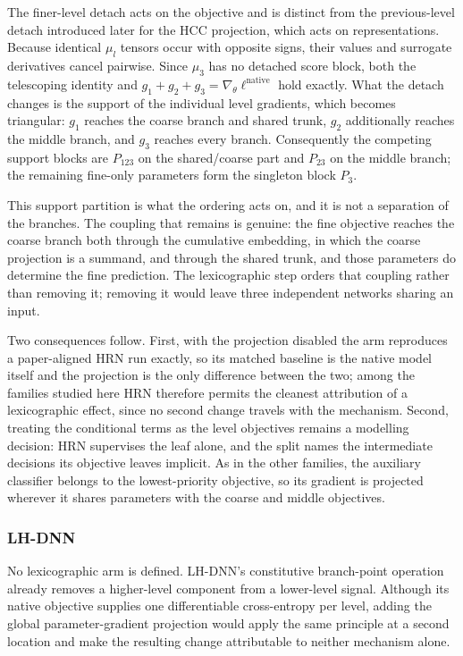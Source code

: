 The finer-level detach acts on the objective and is distinct from the
previous-level detach introduced later for the HCC projection, which acts on
representations. Because identical $\mu_l$ tensors occur with opposite signs,
their values and surrogate derivatives cancel pairwise. Since $\mu_3$ has no
detached score block, both the telescoping identity and
$g_1+g_2+g_3=\nabla_\theta\ell^{\mathrm{native}}$ hold exactly. What the detach
changes is the support of the individual level gradients, which becomes
triangular: $g_1$ reaches the coarse branch and shared trunk, $g_2$ additionally
reaches the middle branch, and $g_3$ reaches every branch. Consequently the
competing support blocks are $P_{123}$ on the shared/coarse part and $P_{23}$ on
the middle branch; the remaining fine-only parameters form the singleton block
$P_3$.

This support partition is what the ordering acts on, and it is not a separation
of the branches. The coupling that remains is genuine: the fine objective
reaches the coarse branch both through the cumulative embedding, in which the
coarse projection is a summand, and through the shared trunk, and those
parameters do determine the fine prediction. The lexicographic step orders that
coupling rather than removing it; removing it would leave three independent
networks sharing an input.

Two consequences follow. First, with the projection disabled the arm reproduces
a paper-aligned HRN run exactly, so its matched baseline is the native model
itself and the projection is the only difference between the two; among the
families studied here HRN therefore permits the cleanest attribution of a
lexicographic effect, since no second change travels with the mechanism.
Second, treating the conditional terms as the level objectives remains a
modelling decision: HRN supervises the leaf alone, and the split names the
intermediate decisions its objective leaves implicit. As in the other families,
the auxiliary classifier belongs to the lowest-priority objective, so its
gradient is projected wherever it shares parameters with the coarse and middle
objectives.

\subsubsection{LH-DNN}
No lexicographic arm is defined. LH-DNN's constitutive
branch-point operation already removes a higher-level component from a
lower-level signal. Although its native objective supplies one differentiable
cross-entropy per level, adding the global parameter-gradient projection would
apply the same principle at a second location and make the resulting change
attributable to neither mechanism alone.

